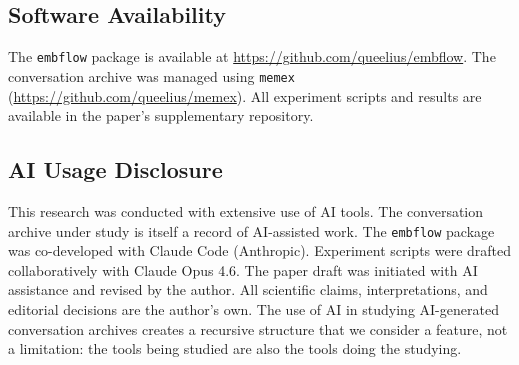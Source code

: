 \documentclass[11pt]{article}
\begin{document}
\subsection*{Software Availability}

The \texttt{embflow} package is available at \url{https://github.com/queelius/embflow}. The conversation archive was managed using \texttt{memex} (\url{https://github.com/queelius/memex}). All experiment scripts and results are available in the paper's supplementary repository.

\subsection*{AI Usage Disclosure}

This research was conducted with extensive use of AI tools. The conversation archive under study is itself a record of AI-assisted work. The \texttt{embflow} package was co-developed with Claude Code (Anthropic). Experiment scripts were drafted collaboratively with Claude Opus 4.6. The paper draft was initiated with AI assistance and revised by the author. All scientific claims, interpretations, and editorial decisions are the author's own. The use of AI in studying AI-generated conversation archives creates a recursive structure that we consider a feature, not a limitation: the tools being studied are also the tools doing the studying.



\end{document}
